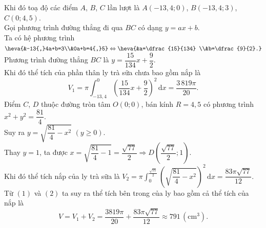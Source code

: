 \begin{bt}
{\begin{center}
		\end{center}
		Khi đó toạ độ các điểm $A$,  $B$, $C$ lần lượt là $A(-13{,}4;0)$, $B(-13{,}4;3)$, $C(0;4{,}5)$.\\
		Gọi phương trình đường thẳng đi qua $BC$ có  dạng $y=ax+b$.\\
		Ta có hệ phương trình $\heva{&-13{,}4a+b=3\\&0a+b=4{,}5}  \Leftrightarrow\heva{&a=\dfrac{15}{134} \\&b=\dfrac{9}{2}.}$\\
		Phương trình đường thẳng  $BC$ là $y=\dfrac{15}{134} x+\dfrac{9}{2}$.\\
		Khi đó thể tích của phần thân ly trà sữa chưa  bao gồm nắp là
		 \[
		V_1=\pi \displaystyle\int_{-13{,}4}^0\left(\dfrac{15}{134}  x+\dfrac{9}{2}\right)^2\,\mathrm{d}x=\dfrac{3\,819\pi}{20}.
		\] 
		Điểm $C$, $D$ thuộc đường tròn  tâm $O(0;0)$, bán kính $R=4{,}5$ có phương trình $x^2+y^2=\dfrac{81}{4}$. \\
		Suy ra $y=\sqrt{\dfrac{81}{4}-x^2}$ $(y\ge  0)$.\\
		Thay $y=1$, ta được $x=\sqrt{\dfrac{81}{4}-1}=\dfrac{\sqrt{77}}{2} \Rightarrow D\left(\dfrac{\sqrt{77}}{2};  1\right)$. \\
		Khi đó thể  tích nắp của ly trà sữa là $V_2=\pi \displaystyle\int_0^{\frac{\sqrt{77}}{2}}\left(\sqrt{\dfrac{81}{4}-x^2}\right)^2\,\mathrm{d}x=\dfrac{83\pi \sqrt{77}}{12}$.\\
		Từ $(1)$ và $(2)$  ta suy ra thể tích bên trong của ly bao gồm cả thể tích của nắp là
		\[ 
		V=V_1+V_2=\dfrac{3819\pi}{20}+\dfrac{83\pi \sqrt{77}}{12} \approx 791\,\left(\mathrm{cm}^3\right). 
		\] 
	 }
\end{bt}

